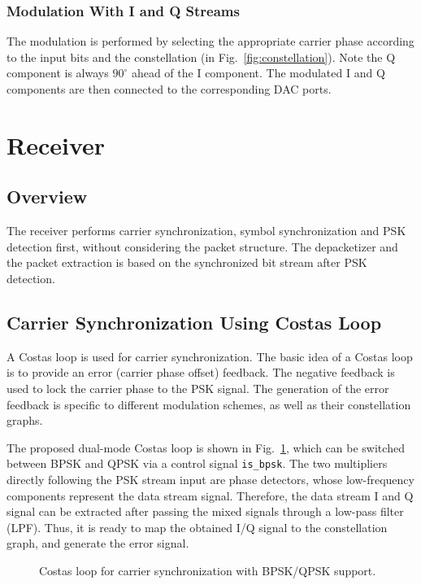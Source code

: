 \documentclass[journal,twoside]{IEEEtran}
\begin{document}
    \subsubsection{Modulation With I and Q Streams}

      The modulation is performed by selecting the appropriate carrier phase
      according to the input bits and the constellation (in Fig.~\ref{fig:constellation}).
      Note the Q component is always $90^\circ$ ahead of the I component.
      The modulated I and Q components are then connected to the corresponding DAC ports.

  \section{Receiver}

    \subsection{Overview}

      The receiver performs carrier synchronization, symbol synchronization and PSK detection first,
      without considering the packet structure.
      The depacketizer and the packet extraction is based on the synchronized bit stream after PSK detection.

    \subsection{Carrier Synchronization Using Costas Loop}\label{subsec:costas}

      A Costas loop \cite{simon1977optimum} is used for carrier synchronization.
      The basic idea of a Costas loop is to provide an error (carrier phase offset) feedback.
      The negative feedback is used to lock the carrier phase to the PSK signal.
      The generation of the error feedback is specific to different modulation schemes,
      as well as their constellation graphs.

      The proposed dual-mode Costas loop is shown in Fig.~\ref{fig:costas_loop},
      which can be switched between BPSK and QPSK via a control signal \texttt{is\_bpsk}.
      The two multipliers directly following the PSK stream input are phase detectors,
      whose low-frequency components represent the data stream signal.
      Therefore, the data stream I and Q signal can be extracted after passing the mixed signals through a low-pass filter (LPF).
      Thus, it is ready to map the obtained I/Q signal to the constellation graph,
      and generate the error signal.
      \begin{figure}[htbp]
        \centering
        
        \caption{Costas loop for carrier synchronization with BPSK/QPSK support.}
        \label{fig:costas_loop}
      \end{figure}
\end{document}
